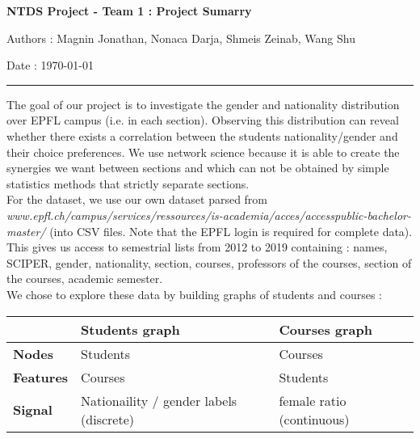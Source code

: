 \documentclass[12pt]{article}
\begin{document}
\begin{center}
\textbf{NTDS Project - Team 1 : Project Sumarry}
\end{center}

\begin{minipage}{0.7 \textwidth}
\begin{flushleft}

	Authors : Magnin Jonathan, Nonaca Darja, Shmeis Zeinab, Wang Shu
	
\end{flushleft}
\end{minipage}
\begin{minipage}{0.29 \textwidth}
\begin{flushright}

	Date : 	\today
	
\end{flushright}
\end{minipage}



\noindent\rule{\textwidth}{1pt}

\vspace{1cm}

The goal of our project is to investigate the gender and nationality distribution over EPFL campus (i.e. in each section). Observing this distribution can reveal whether there exists a correlation between the students nationality/gender and their choice preferences. We use network science because it is able to create the synergies we want between sections and which can not be obtained by simple statistics methods that strictly separate sections.\\

For the dataset, we use our own dataset parsed from \textit{www.epfl.ch/campus/services/ressources/is-academia/acces/accesspublic-bachelor-master/} (into CSV files. Note that the EPFL login is required for complete data). This gives us access to semestrial lists from 2012 to 2019 containing : names, SCIPER, gender, nationality, section, courses, professors of the courses, section of the courses, academic semester.\\


We chose to explore these data by building graphs of students and courses : 
\begin{center}
	\begin{tabular}{|l|l|l|}
		\hline
						& \textbf{Students graph}					& \textbf{Courses graph}		\\
		\hline
		\textbf{Nodes}	& Students									& Courses					\\
		\hline
		\textbf{Features}& Courses									& Students					\\
		\hline
		\textbf{Signal}	& Nationaility / gender labels (discrete)		& female ratio (continuous)	\\
		\hline
	\end{tabular}
\end{center}
\end{document}

